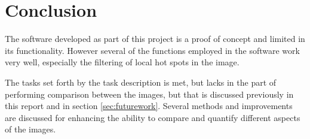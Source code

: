 \chapter{Conclusion}\label{sec:conclusion}

The software developed as part of this project is a proof of concept and limited
in its functionality. However several of the functions employed in the software
work very well, especially the filtering of local hot spots in the image.

The tasks set forth by the task description is met, but lacks in the part of
performing comparison between the images, but that is discussed previously in
this report and in section \ref{sec:futurework}. Several methods and
improvements are discussed for enhancing the ability to compare and quantify
different aspects of the images.


